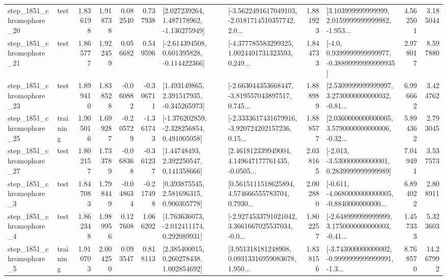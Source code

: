 \begin{tabular}{llrrrrllrlrr}
 step\_1851\_chromophore\_20 &      test &      1.836198 &    1.918738 &      0.082540 &  0.737938 &    [2.027239264, 1.487178962, -1.136275949] &  [-3.5622491617049103, -2.0181714510357742, 2.0... &       1.881923 &  [3.103999999999999, 2.0159999999999982, -1.953... &            4.562501 &          3.185044 \\
 step\_1851\_chromophore\_21 &      test &      1.865777 &    1.922459 &      0.056682 &  0.549596 &   [-2.614394508, 0.601395828, -0.114422366] &  [-4.377785583299325, 1.0024401731323593, 0.249... &       1.844733 &   [-4.0, 0.9399999999999977, -0.38899999999999935] &            2.978017 &          8.597880 \\
 step\_1851\_chromophore\_23 &      test &      1.899410 &    1.838528 &     -0.060882 & -0.306711 &    [1.493149865, 2.391517935, -0.345265973] &  [-2.663044353668447, -3.819557043897517, 0.745... &       1.888989 &  [2.5309999999999997, 3.2730000000000032, -0.81... &            6.996662 &          3.424762 \\
 step\_1851\_chromophore\_25 &  training &      1.905016 &    1.699287 &     -0.205729 & -1.361743 &   [-1.376202859, -2.328256854, 0.491005058] &  [-2.3333617431679916, -3.920724202157236, 0.15... &       1.888577 &  [2.0360000000000005, 3.5790000000000006, -0.32... &            5.894362 &          2.793045 \\
 step\_1851\_chromophore\_27 &      test &      1.802157 &    1.733789 &     -0.068368 & -0.361237 &      [1.44748493, 2.392250547, 0.141358666] &  [2.461812339949004, 4.149647177761435, -0.0505... &       2.038165 &   [-2.013, -3.530000000000001, 0.2839999999999989] &            7.049491 &          3.537573 \\
  step\_1851\_chromophore\_3 &      test &      1.847083 &    1.798449 &     -0.048634 & -0.217498 &     [0.393875545, 2.581696315, 0.900305778] &  [0.5615111518625894, 4.574666555783704, 0.7930... &       2.002880 &  [-0.611, -4.0680000000000005, -0.8840000000000... &            6.894022 &          2.808911 \\
  step\_1851\_chromophore\_4 &      test &      1.862348 &    1.989956 &      0.127608 &  1.066202 &    [1.763636073, -2.012411174, 0.292089931] &  [-2.9274533791021042, 3.3661667025537034, -0.0... &       1.802257 &  [-2.648999999999999, 3.1750000000000003, -0.41... &            1.457333 &          5.323603 \\
  step\_1851\_chromophore\_5 &  training &      1.910703 &    2.004250 &      0.093547 &  0.818113 &     [2.385400015, 0.260278438, 1.002854692] &  [3.951318181248908, 0.09313316959083678, 1.950... &       1.838156 &  [-3.743000000000002, -0.9999999999999991, -1.3... &            8.768570 &         14.267992 \\

\end{tabular}
